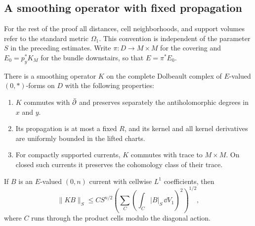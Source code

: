 \subsection{A smoothing operator with fixed propagation}
\label{sp:smoothing}

For the rest of the proof all distances, cell neighborhoods, and support
volumes refer to the standard metric $\Omega_1$.  This convention is
independent of the parameter $S$ in the preceding estimates.
Write $\pi:D\to M\times M$ for the covering and
$E_0=p_y^*K_M$ for the bundle downstairs, so that $E=\pi^*E_0$.

\begin{lemma}\label{sp:smoothing-lemma}
There is a smoothing operator $K$ on the complete Dolbeault complex of
$E$-valued $(0,*)$-forms on $D$ with the following properties:
\begin{enumerate}[label=\textup{(\roman*)}]
\item $K$ commutes with $\bar\partial$ and preserves separately the
antiholomorphic degrees in $x$ and $y$.
\item Its propagation is at most a fixed $R$, and its kernel and all
kernel derivatives are uniformly bounded in the lifted charts.
\item For compactly supported currents, $K$ commutes with trace to
$M\times M$.  On closed such currents it preserves the cohomology class
of their trace.
\end{enumerate}
If $B$ is an $E$-valued $(0,n)$ current with cellwise $L^1$ coefficients,
then
\begin{equation}\label{sp:smoothing-norm}
 \|KB\|_S\le C S^{n/2}
 \left(\sum_C\left(\int_C|B|_S\,\dd V_1\right)^2\right)^{1/2},
\end{equation}
where $C$ runs through the product cells modulo the diagonal action.
\end{lemma}

